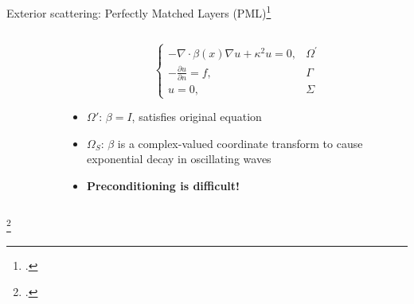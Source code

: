 \documentclass{beamer}
\begin{document}
\begin{frame}{Exterior scattering: Perfectly Matched Layers (PML)\footcite{BERENGER1994185,Erlangga_2006,Bermudez_Hervella-Nieto_Prieto_Rodrguez_2006}}
    \begin{columns}
    \begin{column}{0.45\textwidth}
        \begin{figure}[ht]
        \begin{center}
        \end{center}
        \end{figure}
        \vfill
    \end{column}
    \begin{column}{0.55\textwidth}
        \[
            \begin{cases}
                -\nabla \cdot \beta(x) \nabla u + \kappa^2 u = 0,  & \Omega^\prime \\
                -\frac{\partial u}{\partial n}  =  f, &\Gamma \\
                u = 0, &\Sigma
            \end{cases}
        \]
            \begin{itemize}
              \item<2-> $\Omega'$: $\beta = I$, satisfies original equation
              \item<3-> $\Omega_S$: $\beta$ is a complex-valued coordinate transform to cause exponential decay
              in oscillating waves
              \item<4-> {\bf Preconditioning is difficult!\footnotemark}
            \end{itemize}
    \end{column}
    \end{columns}
    \footcitetext{EngquistPMLPreconditioner2011,Safin_Minkoff_Zweck_2018}
\end{frame}
\end{document}
